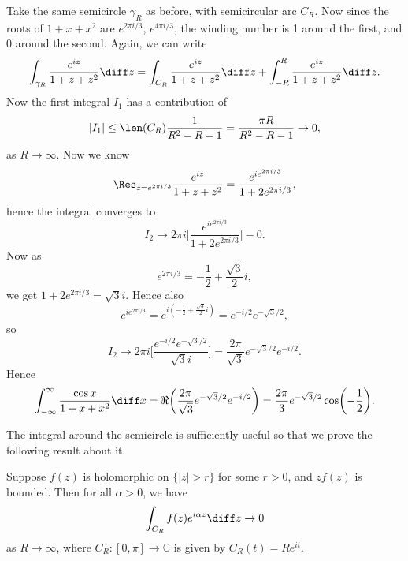 \documentclass[12pt]{article}
\begin{document}
\begin{exbox}
\begin{enumerate}
			Take the same semicircle $\gamma_R$ as before, with semicircular arc $C_R$. Now since the roots of $1 + x + x^2$ are $e^{2\pi i/3}$, $e^{4 \pi i/3}$, the winding number is 1 around the first, and 0 around the second. Again, we can write
			\[
			\int_{\gamma_R} \frac{e^{iz}}{1 + z + z^2}\diff z = \int_{C_R} \frac{e^{iz}}{1 + z + z^2} \diff z + \int_{-R}^R \frac{e^{iz}}{1 + z + z^2}\diff z.
			\]
			Now the first integral $I_1$ has a contribution of
			\[
			|I_1| \le \len(C_R) \frac{1}{R^2 - R - 1} = \frac{\pi R}{R^2 - R - 1} \to 0,
			\]
			as $R \to \infty$. Now we know
			\[
				\Res_{z = e^{2\pi i/3}} \frac{e^{iz}}{1 + z + z^2} = \frac{e^{i e^{2 \pi i/3}}}{1 + 2e^{2 \pi i/3}},
			\]
			hence the integral converges to
			\[
				I_2 \to 2 \pi i \biggl[ \frac{e^{i e^{2 \pi i/3}}}{1 + 2 e^{2 \pi i/3}} \biggr] - 0.
			\]
			Now as
			\[
			e^{2 \pi i/3} = - \frac{1}{2} + \frac{\sqrt 3}{2} i,
			\]
			we get $1 + 2 e^{2 \pi i/3} = \sqrt 3 i$. Hence also
			\[
			e^{i e^{2 \pi i/3}} = e^{i (- \frac{1}{2} + \frac{\sqrt 3}{2} i)} = e^{-i/2} e^{-\sqrt 3/2},
			\]
			so
			\[
				I_2 \to 2 \pi i \biggl[ \frac{e^{-i/2}e^{-\sqrt 3/2}}{\sqrt 3 i} \biggr] = \frac{2\pi}{\sqrt 3} e^{-\sqrt 3/2} e^{-i/2}.
			\]
			Hence
			\[
			\int_{-\infty}^{\infty} \frac{\cos x}{1 + x + x^2}\diff x = \Re \biggl( \frac{2\pi}{\sqrt 3} e^{-\sqrt 3/2} e^{-i/2} \biggr) = \frac{2\pi}{3} e^{-\sqrt 3/2}\cos \biggl( - \frac{1}{2} \biggr).
			\]
	\end{enumerate}
\end{exbox}

The integral around the semicircle is sufficiently useful so that we prove the following result about it.

\begin{lemma}
	Suppose $f(z)$ is holomorphic on $\{|z|>r\}$ for some $r > 0$, and $z f(z)$ is bounded. Then for all $\alpha > 0$, we have
	\[
		\int_{C_R} f(z) e^{i \alpha z} \diff z \to 0
	\]
	as $R \to \infty$, where $C_R : [0, \pi] \to \mathbb{C}$ is given by $C_R(t) = Re^{it}$.
\end{lemma}
\end{document}
